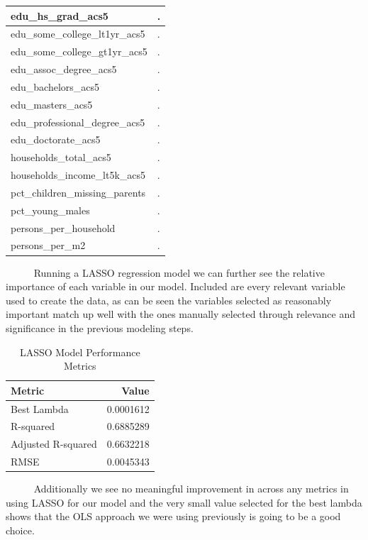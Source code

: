 \documentclass[
  11pt,
  letterpaper,
  DIV=11,
  numbers=noendperiod]{scrartcl}
\begin{document}
\begin{table}
\begin{tabular}[t]{l|l}
\hline
edu\_hs\_grad\_acs5 & .\\
\hline
edu\_some\_college\_lt1yr\_acs5 & .\\
\hline
edu\_some\_college\_gt1yr\_acs5 & .\\
\hline
edu\_assoc\_degree\_acs5 & .\\
\hline
edu\_bachelors\_acs5 & .\\
\hline
edu\_masters\_acs5 & .\\
\hline
edu\_professional\_degree\_acs5 & .\\
\hline
edu\_doctorate\_acs5 & .\\
\hline
households\_total\_acs5 & .\\
\hline
households\_income\_lt5k\_acs5 & .\\
\hline
pct\_children\_missing\_parents & .\\
\hline
pct\_young\_males & .\\
\hline
persons\_per\_household & .\\
\hline
persons\_per\_m2 & .\\
\hline
\end{tabular}
\end{table}

~~~~~ Running a LASSO regression model we can further see the relative
importance of each variable in our model. Included are every relevant
variable used to create the data, as can be seen the variables selected
as reasonably important match up well with the ones manually selected
through relevance and significance in the previous modeling steps.

\begin{table}

\caption{\label{tab:lasso_regression_metrics}LASSO Model Performance Metrics}
\centering
\begin{tabular}[t]{l|r}
\hline
Metric & Value\\
\hline
Best Lambda & 0.0001612\\
\hline
R-squared & 0.6885289\\
\hline
Adjusted R-squared & 0.6632218\\
\hline
RMSE & 0.0045343\\
\hline
\end{tabular}
\end{table}

~~~~~ Additionally we see no meaningful improvement in across any
metrics in using LASSO for our model and the very small value selected
for the best lambda shows that the OLS approach we were using previously
is going to be a good choice.
\end{document}
